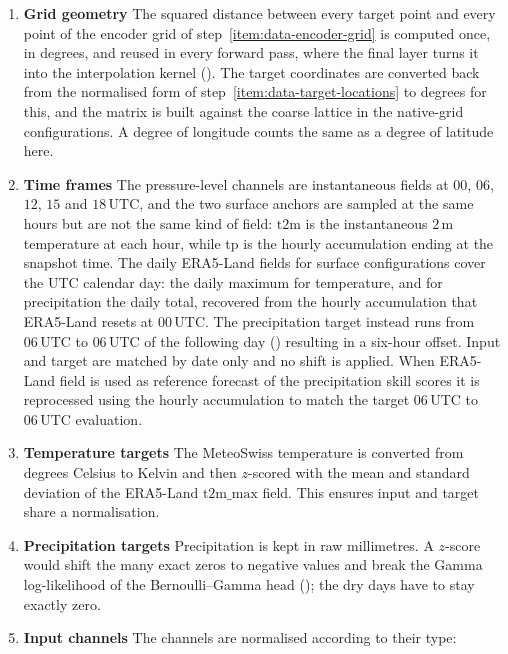 \begin{enumerate}
    \item \textbf{Grid geometry}\label{item:data-grid-geometry} The squared distance between every target point and every point of the encoder grid of step~\ref{item:data-encoder-grid} is computed once, in degrees, and reused in every forward pass, where the final layer turns it into the interpolation kernel (). The target coordinates are converted back from the normalised form of step~\ref{item:data-target-locations} to degrees for this, and the matrix is built against the coarse lattice in the native-grid configurations. A degree of longitude counts the same as a degree of latitude here.
    \item \textbf{Time frames} The pressure-level channels are instantaneous fields at $00$, $06$, $12$, $15$ and $18\,\mathrm{UTC}$, and the two surface anchors are sampled at the same hours but are not the same kind of field: $\mathrm{t2m}$ is the instantaneous $2\,\mathrm{m}$ temperature at each hour, while $\mathrm{tp}$ is the hourly accumulation ending at the snapshot time. The daily ERA5-Land fields for surface configurations cover the UTC calendar day: the daily maximum for temperature, and for precipitation the daily total, recovered from the hourly accumulation that ERA5-Land resets at $00\,\mathrm{UTC}$.
     \newline The precipitation target instead runs from $06\,\mathrm{UTC}$ to $06\,\mathrm{UTC}$ of the following day () resulting in a six-hour offset. \newline Input and target are matched by date only and no shift is applied. When ERA5-Land field is used as reference forecast of the precipitation skill scores it is reprocessed using the hourly accumulation to match the target $06\,\mathrm{UTC}$ to $06\,\mathrm{UTC}$ evaluation.
    \item \textbf{Temperature targets} The MeteoSwiss temperature is converted from degrees Celsius to Kelvin and then $z$-scored with the mean and standard deviation of the ERA5-Land $\mathrm{t2m\_max}$ field. This ensures input and target share a normalisation.
    \item \textbf{Precipitation targets} Precipitation is kept in raw millimetres. A $z$-score would shift the many exact zeros to negative values and break the Gamma log-likelihood of the Bernoulli--Gamma head (); the dry days have to stay exactly zero.
    \item \textbf{Input channels} The channels are normalised according to their type:

\end{enumerate}

